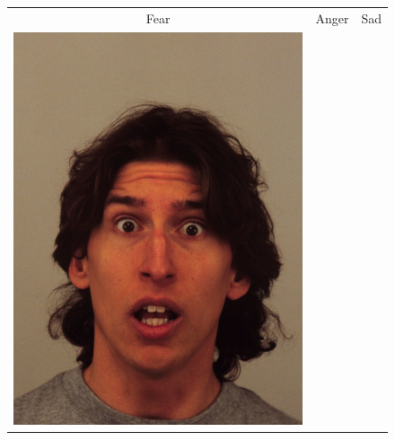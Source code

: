 \begin{figure}[H]
  \centering
  \begin{tabular}[t]{ccc}
    Fear & Anger & Sad \\
    \includegraphics[scale=0.2]{Chapter4/Figs/MissedFear}
         &

\end{tabular}
\end{figure}
